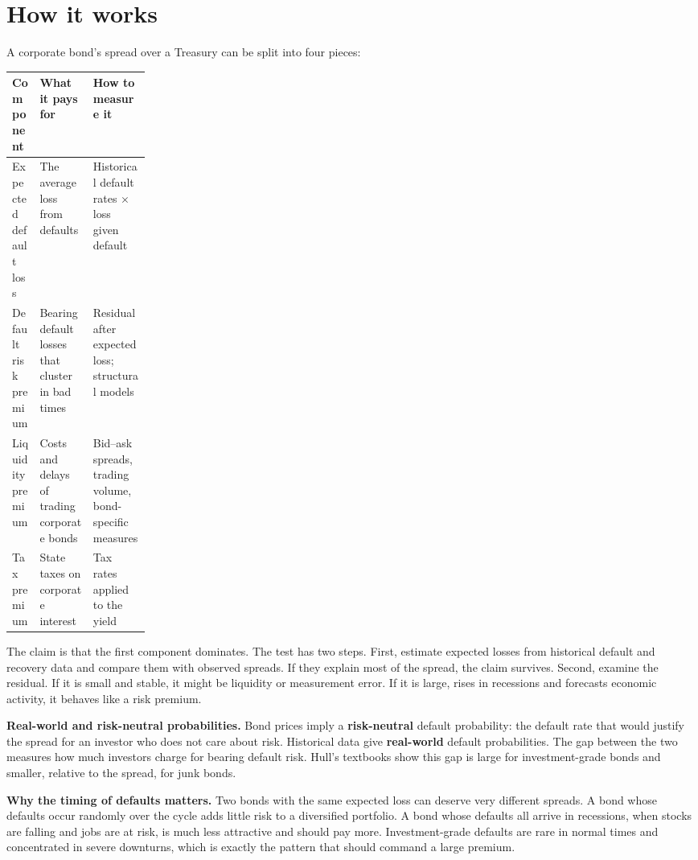 \section{How it works}
\label{sec:17-how}

A corporate bond's spread over a Treasury can be split into four pieces:

\begin{center}
\small
\begin{tabularx}{0.9\linewidth}{@{}>{\raggedright\arraybackslash}p{0.2\linewidth}>{\raggedright\arraybackslash}X>{\raggedright\arraybackslash}X@{}}
\toprule
Component & What it pays for & How to measure it \\
\midrule
Expected default loss & The average loss from defaults & Historical default rates $\times$ loss given default \\
Default risk premium & Bearing default losses that cluster in bad times & Residual after expected loss; structural models \\
Liquidity premium & Costs and delays of trading corporate bonds & Bid--ask spreads, trading volume, bond-specific measures \\
Tax premium & State taxes on corporate interest & Tax rates applied to the yield \\
\bottomrule
\end{tabularx}
\end{center}

The claim is that the first component dominates. The test has two steps. First, estimate expected losses from historical default and recovery data and compare them with observed spreads. If they explain most of the spread, the claim survives. Second, examine the residual. If it is small and stable, it might be liquidity or measurement error. If it is large, rises in recessions and forecasts economic activity, it behaves like a risk premium.

\textbf{Real-world and risk-neutral probabilities.} Bond prices imply a \textbf{risk-neutral} default probability: the default rate that would justify the spread for an investor who does not care about risk. Historical data give \textbf{real-world} default probabilities. The gap between the two measures how much investors charge for bearing default risk. Hull's textbooks show this gap is large for investment-grade bonds and smaller, relative to the spread, for junk bonds.

\textbf{Why the timing of defaults matters.} Two bonds with the same expected loss can deserve very different spreads. A bond whose defaults occur randomly over the cycle adds little risk to a diversified portfolio. A bond whose defaults all arrive in recessions, when stocks are falling and jobs are at risk, is much less attractive and should pay more. Investment-grade defaults are rare in normal times and concentrated in severe downturns, which is exactly the pattern that should command a large premium.

